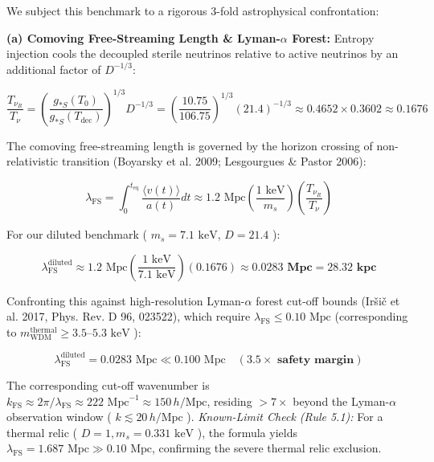 \documentclass[11pt,a4paper]{article}
\theoremstyle{definition}
\theoremstyle{remark}
\begin{document}
We subject this benchmark to a rigorous 3-fold astrophysical confrontation:

\textbf{(a) Comoving Free-Streaming Length \& Lyman-$\alpha$ Forest:}
Entropy injection cools the decoupled sterile neutrinos relative to active neutrinos by an additional factor of $D^{-1/3}$:


\begin{equation}
\frac{T_{\nu_R}}{T_\nu} = \left(\frac{g_{*S}(T_0)}{g_{*S}(T_{\text{dec}})}\right)^{1/3} D^{-1/3} = \left(\frac{10.75}{106.75}\right)^{1/3} (21.4)^{-1/3} \approx 0.4652 \times 0.3602 \approx \mathbf{0.1676}
\end{equation}


The comoving free-streaming length is governed by the horizon crossing of non-relativistic transition (Boyarsky et al. 2009; Lesgourgues \& Pastor 2006):


\begin{equation}
\lambda_{\text{FS}} = \int_0^{t_{\text{eq}}} \frac{\langle v(t)\rangle}{a(t)} dt \approx 1.2\text{ Mpc} \left(\frac{1\text{ keV}}{m_s}\right) \left(\frac{T_{\nu_R}}{T_\nu}\right)
\end{equation}


For our diluted benchmark ( $m_s = 7.1\text{ keV}$, $D = 21.4$ ):


\begin{equation}
\lambda_{\text{FS}}^{\text{diluted}} \approx 1.2\text{ Mpc} \left(\frac{1\text{ keV}}{7.1\text{ keV}}\right) (0.1676) \approx \mathbf{0.0283\text{ Mpc}} = \mathbf{28.32\text{ kpc}}
\end{equation}


Confronting this against high-resolution Lyman-$\alpha$ forest cut-off bounds (Iršič et al. 2017, Phys. Rev. D 96, 023522), which require $\lambda_{\text{FS}} \le 0.10\text{ Mpc}$ (corresponding to $m_{\text{WDM}}^{\text{thermal}} \ge 3.5\text{--}5.3\text{ keV}$ ):


\begin{equation}
\lambda_{\text{FS}}^{\text{diluted}} = 0.0283\text{ Mpc} \ll 0.100\text{ Mpc} \quad (\mathbf{3.5\times \text{ safety margin}})
\end{equation}


The corresponding cut-off wavenumber is $k_{\text{FS}} \approx 2\pi / \lambda_{\text{FS}} \approx 222\text{ Mpc}^{-1} \approx 150\,h/\text{Mpc}$, residing $> 7\times$ beyond the Lyman-$\alpha$ observation window ( $k \lesssim 20\,h/\text{Mpc}$ ).
\textit{Known-Limit Check (Rule 5.1):} For a thermal relic ( $D=1, m_s = 0.331\text{ keV}$ ), the formula yields $\lambda_{\text{FS}} = 1.687\text{ Mpc} \gg 0.10\text{ Mpc}$, confirming the severe thermal relic exclusion.
\end{document}
